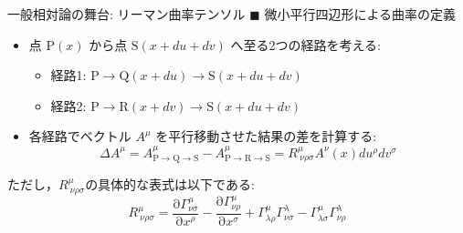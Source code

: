 \documentclass[unicode, aspectratio=169, 12pt]{beamer}
\newcommand{\pdiff}[2]{\frac{\mathrm{\partial} #1}{\mathrm{\partial} #2}} %
\begin{document}
\begin{frame}{一般相対論の舞台: リーマン曲率テンソル}
    $\blacksquare$ 微小平行四辺形による曲率の定義
    \begin{itemize}
        \item 点 $\mathrm{P}(x)$ から点 $\mathrm{S}(x+du+dv)$ へ至る2つの経路を考える:
        \begin{itemize}
            \item 経路1: $\mathrm{P} \to \mathrm{Q}(x+du) \to \mathrm{S}(x+du+dv)$
            \item 経路2: $\mathrm{P} \to \mathrm{R}(x+dv) \to \mathrm{S}(x+du+dv)$
        \end{itemize}
        \item 各経路でベクトル $A^\mu$ を平行移動させた結果の差を計算する:
        \begin{equation*}
            \Delta A^\mu = A^\mu_{\mathrm{P \to Q \to S}} - A^\mu_{\mathrm{P \to R \to S}} = R^\mu_{\ \nu\rho\sigma} A^\nu(x) du^\rho dv^\sigma
        \end{equation*}
    \end{itemize}
    ただし，$R^\mu_{\ \nu\rho\sigma}$の具体的な表式は以下である:
    \begin{equation*}
        R^\mu_{\ \nu\rho\sigma} = \pdiff{\Gamma^\mu_{\nu\sigma}}{x^\rho} - \pdiff{\Gamma^\mu_{\nu\rho}}{x^\sigma} + \Gamma^\mu_{\lambda\rho}\Gamma^\lambda_{\nu\sigma} - \Gamma^\mu_{\lambda\sigma}\Gamma^\lambda_{\nu\rho}
    \end{equation*}
\end{frame}
\end{document}
